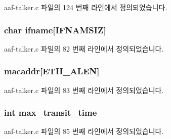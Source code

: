 aaf-\/talker.\+c 파일의 124 번째 라인에서 정의되었습니다.

\subsubsection[{\texorpdfstring{ifname}{ifname}}]{\setlength{\rightskip}{0pt plus 5cm}char ifname\mbox{[}{\bf I\+F\+N\+A\+M\+S\+IZ}\mbox{]}\hspace{0.3cm}{\ttfamily [static]}}\hypertarget{aaf-talker_8c_ac7b430acaa92a7a26fbcdad47d2efc20}{}\label{aaf-talker_8c_ac7b430acaa92a7a26fbcdad47d2efc20}


aaf-\/talker.\+c 파일의 82 번째 라인에서 정의되었습니다.

\subsubsection[{\texorpdfstring{macaddr}{macaddr}}]{ macaddr\mbox{[}{\bf E\+T\+H\+\_\+\+A\+L\+EN}\mbox{]}\hspace{0.3cm}{\ttfamily [static]}}\hypertarget{aaf-talker_8c_a951f0a7da0c9d9009218fb069f9d3f2a}{}\label{aaf-talker_8c_a951f0a7da0c9d9009218fb069f9d3f2a}


aaf-\/talker.\+c 파일의 83 번째 라인에서 정의되었습니다.

\subsubsection[{\texorpdfstring{max\+\_\+transit\+\_\+time}{max_transit_time}}]{\setlength{\rightskip}{0pt plus 5cm}int max\+\_\+transit\+\_\+time\hspace{0.3cm}{\ttfamily [static]}}\hypertarget{aaf-talker_8c_a8755673da5bacdb08ed9d17a8288007e}{}\label{aaf-talker_8c_a8755673da5bacdb08ed9d17a8288007e}


aaf-\/talker.\+c 파일의 85 번째 라인에서 정의되었습니다.

